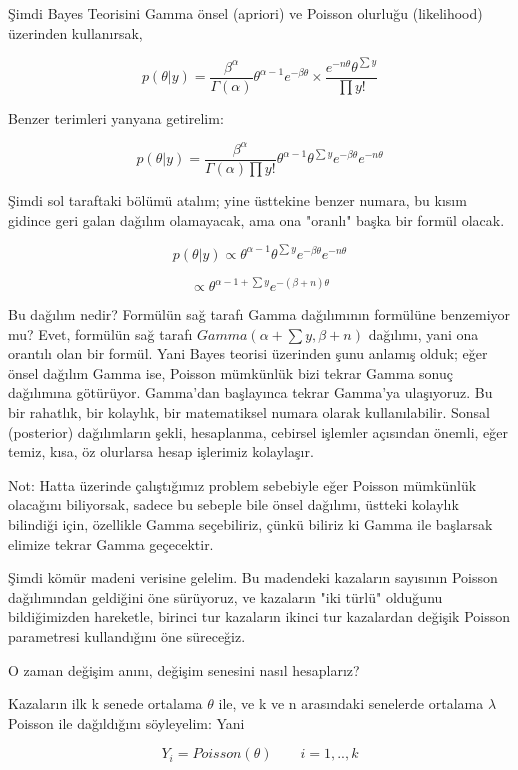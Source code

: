 \documentclass[12pt,fleqn]{article}\usepackage{../../common}
\begin{document}
Şimdi Bayes Teorisini Gamma önsel (apriori) ve Poisson olurluğu
(likelihood) üzerinden kullanırsak,

$$ 
p(\theta|y) = \frac{\beta^\alpha}{\Gamma(\alpha)}
\theta^{\alpha-1}e^{-\beta\theta} \times
\frac{e^{-n\theta}\theta^{\sum y}}{\prod y!} 
$$

Benzer terimleri yanyana getirelim:

$$ 
p(\theta|y) = \frac{\beta^\alpha}{\Gamma(\alpha)\prod y!}
\theta^{\alpha-1}\theta^{\sum y}e^{-\beta\theta} e^{-n\theta} 
$$

Şimdi sol taraftaki bölümü atalım; yine üsttekine benzer numara, bu
kısım gidince geri galan dağılım olamayacak, ama ona "oranlı" başka
bir formül olacak.

$$ p(\theta|y)  \propto  \theta^{\alpha-1}\theta^{\sum y}e^{-\beta\theta} e^{-n\theta} $$

$$  \propto \theta^{\alpha-1+\sum y}e^{-(\beta+n)\theta}  $$

Bu dağılım nedir? Formülün sağ tarafı Gamma dağılımının formülüne
benzemiyor mu?  Evet, formülün sağ tarafı $Gamma(\alpha+\sum y, \beta
+ n)$ dağılımı, yani ona orantılı olan bir formül. Yani Bayes teorisi
üzerinden şunu anlamış olduk; eğer önsel dağılım Gamma ise, Poisson
mümkünlük bizi tekrar Gamma sonuç dağılımına götürüyor. Gamma'dan
başlayınca tekrar Gamma'ya ulaşıyoruz. Bu bir rahatlık, bir kolaylık,
bir matematiksel numara olarak kullanılabilir. Sonsal (posterior)
dağılımların şekli, hesaplanma, cebirsel işlemler açısından önemli,
eğer temiz, kısa, öz olurlarsa hesap işlerimiz kolaylaşır.

Not: Hatta üzerinde çalıştığımız problem sebebiyle eğer Poisson
mümkünlük olacağını biliyorsak, sadece bu sebeple bile önsel dağılımı,
üstteki kolaylık bilindiği için, özellikle Gamma seçebiliriz, çünkü
biliriz ki Gamma ile başlarsak elimize tekrar Gamma geçecektir.

Şimdi kömür madeni verisine gelelim. Bu madendeki kazaların sayısının Poisson
dağılımından geldiğini öne sürüyoruz, ve kazaların "iki türlü" olduğunu
bildiğimizden hareketle, birinci tur kazaların ikinci tur kazalardan değişik
Poisson parametresi kullandığını öne süreceğiz.

O zaman değişim anını, değişim senesini nasıl hesaplarız?

Kazaların ilk k senede ortalama $\theta$ ile, ve k ve n arasındaki
senelerde ortalama $\lambda$ Poisson ile dağıldığını söyleyelim: Yani

$$ Y_i = Poisson(\theta) \qquad i=1,..,k   $$
\end{document}
